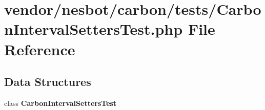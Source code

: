 \section{vendor/nesbot/carbon/tests/\+Carbon\+Interval\+Setters\+Test.php File Reference}
\label{_carbon_interval_setters_test_8php}
\subsection*{Data Structures}
\begin{DoxyCompactItemize}
\item 
class {\bf Carbon\+Interval\+Setters\+Test}
\end{DoxyCompactItemize}

